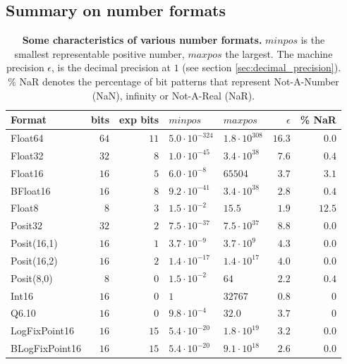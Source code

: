 
\subsection{Summary on number formats}
\label{sec:summary_formats}

\begin{table}[htbp]
\center
\begin{tabular}{l | r | r | l | l | r | r}
Format & bits & exp bits & $minpos$ & $maxpos$ & $\epsilon$ &  \% NaR \\
\hline
Float64    & $64$ & $11$ & $5.0 \cdot 10^{-324}$ & $1.8 \cdot 10^{308}$  & $16.3$ & $0.0$ \\
Float32    & $32$ & $8$ & $1.0 \cdot 10^{-45}$ & $3.4 \cdot 10^{38}$ & $7.6$ & $0.4$ \\
Float16    & $16$ & $5$ & $6.0 \cdot 10^{-8}$ & $65504$ & $3.7$ & $3.1$ \\
BFloat16    & $16$ & $8$ & $ 9.2 \cdot 10^{-41}$ & $3.4 \cdot 10^{38}$ & $2.8$ & $0.4$  \\
Float8 & $8$ & $3$ & $1.5 \cdot 10^{-2}$ & $15.5$ & $1.9$ & $12.5$\\
\hline
Posit32    & $32$ & $2$ &  $7.5 \cdot 10^{-37}$ & $7.5 \cdot 10^{37}$ & $8.8$ & $0.0$ \\
Posit(16,1) & $16$ & $1$ & $3.7 \cdot 10^{-9}$ & $3.7 \cdot 10^{9}$ & $4.3$ & $0.0$\\
Posit(16,2) & $16$ & $2$ & $1.4 \cdot 10^{-17}$ & $1.4 \cdot 10^{17}$ & $4.0$ & $0.0$\\
Posit(8,0) & $8$ & $0$ & $1.5 \cdot 10^{-2}$ & $64$ & $2.2$ & $0.4$  \\
\hline
Int16 & $16$ & $0$ & $1$ & $32767$ & $0.8$ & $0$\\
Q6.10 & $16$ & $0$ & $9.8 \cdot 10^{-4}$ & $32.0$ & $3.7$ & $0$\\
\hline
LogFixPoint16 & $16$ & $15$ & $5.4 \cdot 10^{-20}$ & $1.8 \cdot 10^{19}$ & $3.2$ & $0.0$\\
BLogFixPoint16 & $16$ & $15$ & $5.4 \cdot 10^{-20}$ & $9.1 \cdot 10^{18}$ & $2.6$ & $0.0$
\end{tabular}
\vspace{10pt}
\caption{\textbf{Some characteristics of various number formats.} $minpos$ is the smallest representable positive number,
$maxpos$ the largest. The machine precision $\epsilon$, is the decimal precision at $1$ (see section \ref{sec:decimal_precision}).
\% NaR denotes the percentage of bit patterns that represent Not-A-Number (NaN), infinity or Not-A-Real (NaR).}
\label{tab:formats}
\end{table}


